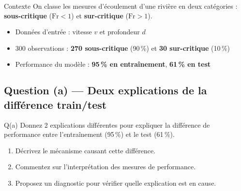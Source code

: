 \documentclass[12pt,a4paper]{article}
\begin{document}
\begin{enonce}{Contexte}
On classe les mesures d'écoulement d'une rivière en deux catégories :
\textbf{sous-critique} ($\mathrm{Fr} < 1$) et \textbf{sur-critique} ($\mathrm{Fr} > 1$).
\begin{itemize}[itemsep=2pt]
  \item Données d'entrée : vitesse $v$ et profondeur $d$
  \item 300 observations : \textbf{270 sous-critique} (90\,\%) et \textbf{30 sur-critique} (10\,\%)
  \item Performance du modèle : \textbf{95\,\% en entraînement}, \textbf{61\,\% en test}
\end{itemize}
\end{enonce}

\subsection{Question (a) — Deux explications de la différence train/test}

\begin{enonce}{Q(a)}
Donnez 2 explications différentes pour expliquer la différence de performance entre l'entraînement (95\,\%) et le test (61\,\%).
\begin{enumerate}[label=\roman*)]
  \item Décrivez le mécanisme causant cette différence.
  \item Commentez sur l'interprétation des mesures de performance.
  \item Proposez un diagnostic pour vérifier quelle explication est en cause.
\end{enumerate}
\end{enonce}
\end{document}
